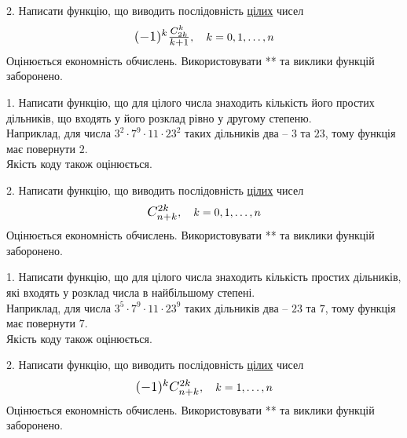 \documentclass[12pt, ukrainian]{article}
\begin{document}
\begin{Large}
\vspace{10mm}

\newpage

2. 
Написати функцію, що виводить послідовність \underline{цілих} чисел
$$\scalebox{1.2}{$(-1)^{k}\frac{C_{2k}^k}{k+1}$}, \quad k=0,1,\ldots,n$$
Оцінюється економність обчислень. Використовувати ** та виклики функцій заборонено.

\newpage




1. Написати функцію, що для цілого числа знаходить кількість його простих дільників, що входять у його розклад рівно у другому степеню. \\ Наприклад, для числа $3^2{\cdot}7^9{\cdot}11{\cdot}23^{2}$ таких дільників два – $3$ та $23$, тому функція має повернути $2$.\\	Якість коду також оцінюється. 



\vspace{10mm}

\newpage

2. 
Написати функцію, що виводить послідовність \underline{цілих} чисел
$$\scalebox{1.2}{$C_{n+k}^{2k}$}, \quad k=0,1,\ldots,n$$
Оцінюється економність обчислень. Використовувати ** та виклики функцій заборонено.

\newpage




1. Написати функцію, що для цілого числа знаходить кількість простих дільників, які входять у розклад числа в найбільшому степені. \\ Наприклад, для числа $3^5{\cdot}7^9{\cdot}11{\cdot}23^{9}$ таких дільників два – $23$ та $7$, тому функція має повернути $7$.\\	Якість коду також оцінюється. 



\vspace{10mm}

\newpage

2. 
Написати функцію, що виводить послідовність \underline{цілих} чисел
$$\scalebox{1.2}{$(-1)^{k}C_{n+k}^{2k}$}, \quad k=1,\ldots,n$$
Оцінюється економність обчислень. Використовувати ** та виклики функцій заборонено.

\newpage





\end{Large}
\end{document}
